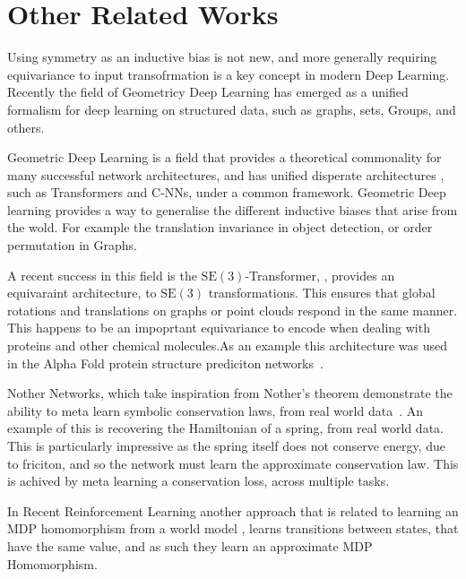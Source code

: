 \section{Other Related Works}
Using symmetry as an inductive bias is not new, and more generally requiring equivariance to input transofrmation is a key concept in modern Deep Learning. Recently the field of Geometricy Deep Learning has emerged as a unified formalism for deep learning on structured data, such as graphs, sets, Groups, and others.

Geometric Deep Learning is a field that provides a theoretical commonality for many successful network architectures, and has unified disperate architectures \cite{bronstein2021geometric}, such as Transformers and C-NNs, under a common framework. Geometric Deep learning provides a way to generalise the different inductive biases that arise from the wold. For example the translation invariance in object detection, or order permutation in Graphs.

A recent success in this field is the $\text{SE}(3)$-Transformer, \cite{fuchs2020se}, provides an equivaraint architecture, to $\text{SE}(3)$ transformations. This ensures that global rotations and translations on graphs or point clouds respond in the same manner. This happens to be an impoprtant equivariance to encode when dealing with proteins and other chemical molecules.As an example this architecture was used in the Alpha Fold protein structure prediciton networks~\cite{jumper2021highly}.

Nother Networks, which take inspiration from Nother's theorem demonstrate the ability to meta learn symbolic conservation laws, from real world data~\cite{alet2021noether}. An example of this is recovering the Hamiltonian of a spring, from real world data. This is particularly impressive as the spring itself does not conserve energy, due to friciton, and so the network must learn the approximate conservation law. This is achived by meta learning a conservation loss, across multiple tasks.

In Recent Reinforcement Learning another approach that is related to learning an MDP homomorphism from a world model \cite{mavor2022simple}, learns transitions between states, that have the same value, and as such they learn an approximate MDP Homomorphism.


